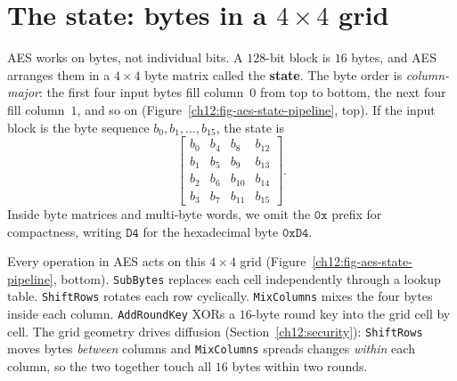\section{The state: bytes in a $4\times 4$ grid}

AES works on bytes, not individual bits. A $128$-bit block is $16$ bytes, and AES
arranges them in a $4\times 4$ byte matrix called the \textbf{state}. The byte
order is \emph{column-major}: the first four input bytes fill column~$0$ from top
to bottom, the next four fill column~$1$, and so on (Figure~\ref{ch12:fig-aes-state-pipeline}, top).
If the input block is the byte sequence $b_0, b_1, \dots, b_{15}$, the state is
\[
\begin{bmatrix}
b_0 & b_4 & b_8 & b_{12}\\
b_1 & b_5 & b_9 & b_{13}\\
b_2 & b_6 & b_{10} & b_{14}\\
b_3 & b_7 & b_{11} & b_{15}
\end{bmatrix}.
\]
Inside byte matrices and multi-byte words, we omit the $\mathtt{0x}$ prefix for
compactness, writing $\mathtt{D4}$ for the hexadecimal byte $\mathtt{0xD4}$.

Every operation in AES acts on this $4\times 4$ grid (Figure~\ref{ch12:fig-aes-state-pipeline}, bottom).
\texttt{SubBytes} replaces each cell independently through a lookup table.
\texttt{ShiftRows} rotates each row cyclically. \texttt{MixColumns} mixes the four
bytes inside each column. \texttt{AddRoundKey} XORs a $16$-byte round key into the
grid cell by cell. The grid geometry drives diffusion
(Section~\ref{ch12:security}): \texttt{ShiftRows} moves bytes \emph{between}
columns and \texttt{MixColumns} spreads changes \emph{within} each column, so the
two together touch all $16$ bytes within two rounds.

